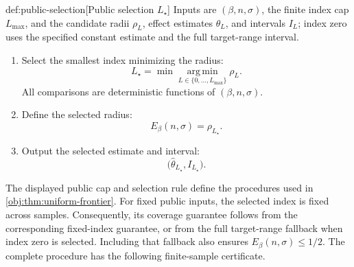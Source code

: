 \begin{algorithmv}{def:public-selection}[Public selection $L_\star$]
Inputs are \((\beta,n,\sigma)\), the finite index cap \(L_{\max}\), and the candidate radii \(\rho_L\), effect estimates \(\widehat\theta_L\), and intervals \(I_L\); index zero uses the specified constant estimate and the full target-range interval.
\begin{enumerate}
\item Select the smallest index minimizing the radius:
\[
L_\star
=
\min\operatorname*{arg\,min}_{L\in\{0,\ldots,L_{\max}\}}
\rho_L.
\]
All comparisons are deterministic functions of \((\beta,n,\sigma)\).
\item Define the selected radius:
\[
E_\beta(n,\sigma)=\rho_{L_\star}.
\]
\item Output the selected estimate and interval:
\[
\bigl(\widehat\theta_{L_\star},I_{L_\star}\bigr).
\]
\end{enumerate}
\end{algorithmv}

The displayed public cap and selection rule define the procedures used in \cref{obj:thm:uniform-frontier}. For fixed public inputs, the selected index is fixed across samples. Consequently, its coverage guarantee follows from the corresponding fixed-index guarantee, or from the full target-range fallback when index zero is selected. Including that fallback also ensures \(E_\beta(n,\sigma)\le1/2\). The complete procedure has the following finite-sample certificate.

